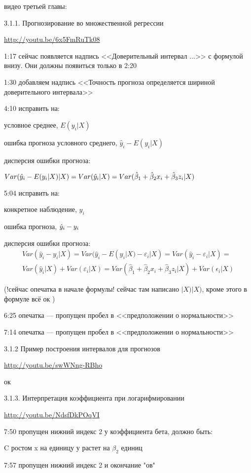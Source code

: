 \documentclass[12pt,a4paper]{article}
\begin{document}
видео третьей главы:

3.1.1. Прогнозирование во множественной регрессии

\url{http://youtu.be/6x5FmRuTk08}

1:17 сейчас появляется надпись <<Доверительный интервал ...>> с формулой внизу. Они должны появиться только в 2:20

1:30 добавляем надпись <<Точность прогноза определяется шириной доверительного интервала>>

4:10 исправить на:

условное среднее, $E(y_i | X)$

ошибка прогноза условного среднего, $\hat{y}_i - E(y_i | X)$

дисперсия ошибки прогноза:

$Var(\hat{y}_i - E(y_i | X)  | X )=Var(\hat{y}_i | X) = Var(\hat{\beta}_1 +\hat{\beta}_2 x_i + \hat{\beta}_3 z_i | X) $ 

5:04 исправить на:

конкретное наблюдение, $y_i$

ошибка прогноза, $\hat{y}_i - y_i$

дисперсия ошибки прогноза:
\begin{multline} \nonumber
Var(\hat{y}_i - y_i | X)=Var(\hat{y}_i - E(y_i | X) - \varepsilon_i | X) = Var(\hat{y}_i - \varepsilon_i | X) = \\
Var(\hat{y}_i|X) + Var( \varepsilon_i | X) = Var(\hat{\beta}_1 +\hat{\beta}_2 x_i + \hat{\beta}_3 z_i | X) + Var(\epsilon_i | X)
\end{multline}

 (!сейчас опечатка в начале формулы! сейчас там написано $|X)|X)$, кроме этого в формуле всё ок )

6:25 опечатка --- пропущен пробел в <<предположении о нормальности>>

7:14 опечатка --- пропущен пробел в <<предположении о нормальности>>


3.1.2 Пример построения интервалов для прогнозов

\url{http://youtu.be/swWNng-RBho}

ок

3.1.3. Интерпретация коэффициента при логарифмировании

\url{http://youtu.be/NdsfDkPOqVI}

7:50 пропущен нижний индекс 2 у коэффициента бета, должно быть:

C ростом x на единицу у растет на $\beta_2$ единиц

7:57 пропущен нижний индекс 2 и окончание "ов"
\end{document}

